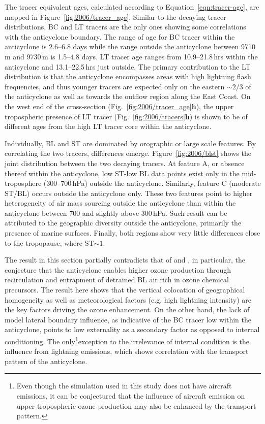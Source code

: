 The tracer equivalent ages, calculated according to Equation~\ref{eqn:tracer-age}, are mapped in Figure~\ref{fig:2006/tracer_age}.
Similar to the decaying tracer distributions, BC and LT tracers are the only ones showing some correlations with the anticyclone boundary.
The range of age for BC tracer within the anticyclone is 2.6--6.8 days while the range outside the anticyclone between 9710\,\unit{m} and
9730\,\unit{m} is 1.5--4.8 days. LT tracer age ranges from 10.9--21.8\,\unit{hrs} within the anticyclone and 13.1--22.5\,\unit{hrs}
just outside. The primary contribution to the LT distribution is that the anticyclone encompasses areas with high lightning flash frequencies,
and thus younger tracers are expected only on the eastern $\sim2/3$ of the anticyclone as well as towards the outflow region along
the East Coast. On the west end of the cross-section (Fig.~\ref{fig:2006/tracer_age}{\bf h}), the upper tropospheric presence of LT tracer
(Fig.~\ref{fig:2006/tracers}{\bf h}) is shown to be of different ages from the high LT tracer core within the anticyclone.


Individually, BL and ST are dominated by orographic or large scale features. By correlating the two tracers, differences emerge.
Figure~\ref{fig:2006/blst} shows the joint distribution between the two decaying tracers. At feature A, or absence thereof within the
anticyclone, low ST-low BL data points exist only in the mid-troposphere (300--700\,\unit{hPa}) outside the anticyclone. Similarly,
feature C (moderate ST/BL) occurs outside the anticyclone only. These two features point to higher heterogeneity of air mass sourcing
outside the anticyclone than within the anticyclone between 700 and slightly above 300\,\unit{hPa}. Such result can be attributed to
the geographic diversity outside the anticyclone, primarily the presence of marine surfaces. Finally, both regions show very little
differences close to the tropopause, where ST$\sim1$.

The result in this section partially contradicts that of \citet{Li:2005ss} and \citet{Cooper:2007cr}, in particular, the conjecture that the anticyclone
enables higher ozone production through recirculation and entrapment of detrained BL air rich in ozone chemical precursors. The result here
shows that the vertical colocation of geographical homogeneity as well as meteorological factors (e.g. high lightning intensity) are the key factors
driving the ozone enhancement. On the other hand, the lack of model lateral boundary influence, as indicative of the BC tracer low within the
anticyclone, points to low externality as a secondary factor as opposed to internal conditioning. The only\footnote{Even though the simulation used
in this study does not have aircraft emissions, it can be conjectured that the influence of aircraft emission on upper tropospheric ozone production
may also be enhanced by the transport pattern.}exception to
the irrelevance of internal condition is the influence from lightning emissions, which shows correlation with the transport pattern of the anticyclone.

